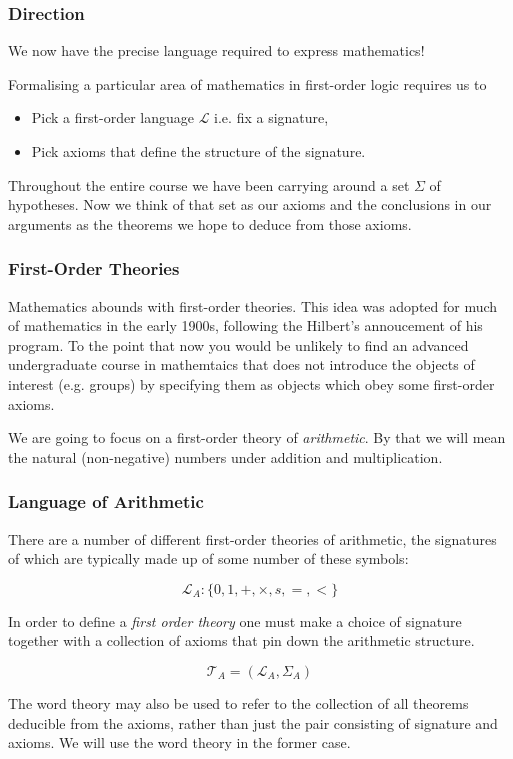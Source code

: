 \documentclass{beamer}
\theoremstyle{indentDefn} \newtheorem{defn}[]{Definition}
\begin{document}
\begin{frame}
  \frametitle{Direction}

	We now have the precise language required to express mathematics!
	
	\vspace{0.5cm}
	
	Formalising a particular area of mathematics in first-order logic requires us to
	
	\begin{itemize}
		\item Pick a first-order language $\mathcal{L}$ i.e. fix a signature,
		\item Pick axioms that define the structure of the signature. 
	\end{itemize}
	
	Throughout the entire course we have been carrying around a set $\Sigma$ of hypotheses. Now we think of that set as our axioms and the conclusions in our arguments as the theorems we hope to deduce from those axioms. 
\end{frame}

\begin{frame}
	\frametitle{First-Order Theories}
	
	Mathematics abounds with first-order theories. This idea was adopted for much of mathematics in the early 1900s, following the Hilbert's annoucement of his program. To the point that now you would be unlikely to find an advanced undergraduate course in mathemtaics that does not introduce the objects of interest (e.g. groups) by specifying them as objects which obey some first-order axioms. 
	
	\vspace{0.2cm}
	
	We are going to focus on a first-order theory of \textit{arithmetic}. By that we will mean the natural (non-negative) numbers under addition and multiplication.

\end{frame}

\begin{frame}
	\frametitle{Language of Arithmetic}

	There are a number of different first-order theories of arithmetic, the signatures of which are typically made up of some number of these symbols:

	$$\mathcal{L}_{A} : \{0,1,+,\times,s,=,<\} $$

	In order to define a \emph{first order theory} one must make a choice of signature together with a collection of axioms that pin down the arithmetic structure. 

	$$\mathcal{T}_{A} = (\mathcal{L}_{A}, \Sigma_{A})$$

	The word theory may also be used to refer to the collection of all theorems deducible from the axioms, rather than just the pair consisting of signature and axioms. We will use the word theory in the former case. 

\end{frame}
\end{document}
